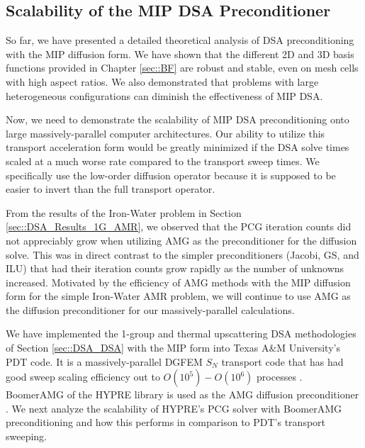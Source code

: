 \subsection{Scalability of the MIP DSA Preconditioner}
\label{sec::DSA_Results_Scaling}

So far, we have presented a detailed theoretical analysis of DSA preconditioning with the MIP diffusion form. We have shown that the different 2D and 3D basis functions provided in Chapter \ref{sec::BF} are robust and stable, even on mesh cells with high aspect ratios. We also demonstrated that problems with large heterogeneous configurations can diminish the effectiveness of MIP DSA.

Now, we need to demonstrate the scalability of MIP DSA preconditioning onto large massively-parallel computer architectures. Our ability to utilize this transport acceleration form would be greatly minimized if the DSA solve times scaled at a much worse rate compared to the transport sweep times. We specifically use the low-order diffusion operator because it is supposed to be easier to invert than the full transport operator.

From the results of the Iron-Water problem in Section \ref{sec::DSA_Results_1G_AMR}, we observed that the PCG iteration counts did not appreciably grow when utilizing AMG as the preconditioner for the diffusion solve. This was in direct contrast to the simpler preconditioners (Jacobi, GS, and ILU) that had their iteration counts grow rapidly as the number of unknowns increased. Motivated by the efficiency of AMG methods with the MIP diffusion form for the simple Iron-Water AMR problem, we will continue to use AMG as the diffusion preconditioner for our massively-parallel calculations.

We have implemented the 1-group and thermal upscattering DSA methodologies of Section \ref{sec::DSA_DSA} with the MIP form into Texas A\&M University's PDT code. It is a massively-parallel DGFEM $S_N$ transport code that has had good sweep scaling efficiency out to $O(10^5)-O(10^6)$ processes \cite{ref::eff_sweeps,adams2013provably}. BoomerAMG of the HYPRE library is used as the AMG diffusion preconditioner \cite{ref::hypre,yang2002boomeramg}. We next analyze the scalability of HYPRE's PCG solver with BoomerAMG preconditioning and how this performs in comparison to PDT's transport sweeping.

